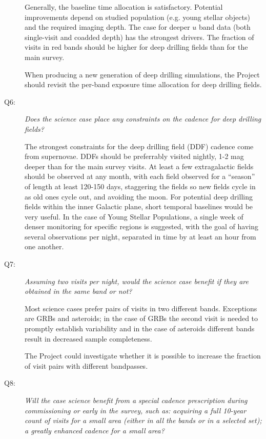 \begin{description}
Generally, the baseline time allocation is satisfactory. Potential
improvements depend on studied population (e.g. young stellar objects)
and the required imaging depth.
The case for deeper $u$ band data (both single-visit and coadded depth)
has the strongest drivers. The fraction of visits in red bands should be
higher for deep drilling fields than for the main survey.

When producing a new generation of deep drilling simulations, the
Project should revisit the per-band exposure time allocation for deep
drilling fields.


\item[Q6:] {\it Does the science case place any constraints on the
cadence for deep drilling fields?}

The strongest constraints for the deep drilling field (DDF) cadence come
from supernovae. DDFs should be preferrably visited nightly,
1-2 mag deeper than for the main survey visits. At least a few
extragalactic fields should be observed at any month, with
each field observed for a ``season'' of length at least 120-150 days,
staggering the fields so new fields cycle in as old ones cycle out, and
avoiding the moon. For
potential deep drilling fields within the inner Galactic plane, short
temporal baselines would be very useful. In the case of Young Stellar
Populations, a single week of denser monitoring for specific regions is
suggested, with the goal of having several observations per night,
separated in time by at least an hour from one another.


\item[Q7:] {\it Assuming two visits per night, would the science case
benefit if they are obtained in the same band or not?}

Most science cases prefer pairs of visits in two different bands.
Exceptions are GRBs and asteroids; in the case of GRBs the second visit is
needed to promptly establish variability and in the case of asteroids
different bands result in decreased sample completeness.

The Project could investigate whether it is possible to increase the
fraction of visit pairs with different bandpasses.


\item[Q8:] {\it Will the case science benefit from a special cadence
prescription during commissioning or early in the survey, such as:
acquiring a full 10-year count of visits for a small area (either in all
the bands or in a  selected set); a greatly enhanced cadence for a small
area?}


\end{description}
